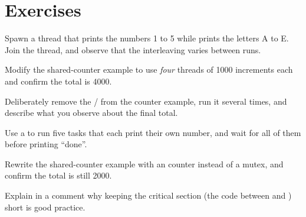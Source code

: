 \section{Exercises}

\exercise Spawn a thread that prints the numbers 1 to 5 while  prints
the letters A to E. Join the thread, and observe that the interleaving varies
between runs.

\exercise Modify the shared-counter example to use \emph{four} threads of 1000
increments each and confirm the total is 4000.

\exercise Deliberately remove the / from the counter
example, run it several times, and describe what you observe about the final total.

\exercise Use a  to run five tasks that each print their own
number, and wait for all of them before printing ``done''.

\exercise Rewrite the shared-counter example with an 
counter instead of a mutex, and confirm the total is still 2000.

\exercise Explain in a comment why keeping the critical section (the code between
 and ) short is good practice.
